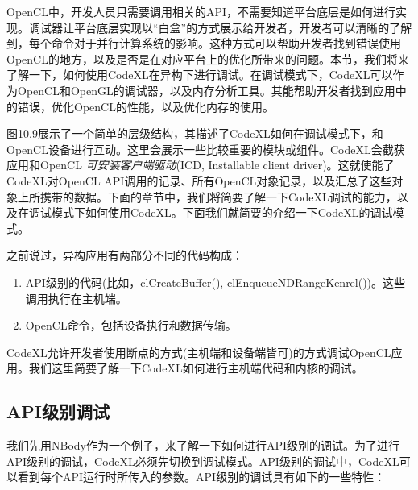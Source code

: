 OpenCL中，开发人员只需要调用相关的API，不需要知道平台底层是如何进行实现。调试器让平台底层实现以“白盒”的方式展示给开发者，开发者可以清晰的了解到，每个命令对于并行计算系统的影响。这种方式可以帮助开发者找到错误使用OpenCL的地方，以及是否是在对应平台上的优化所带来的问题。本节，我们将来了解一下，如何使用CodeXL在异构下进行调试。在调试模式下，CodeXL可以作为OpenCL和OpenGL的调试器，以及内存分析工具。其能帮助开发者找到应用中的错误，优化OpenCL的性能，以及优化内存的使用。


图10.9展示了一个简单的层级结构，其描述了CodeXL如何在调试模式下，和OpenCL设备进行互动。这里会展示一些比较重要的模块或组件。CodeXL会截获应用和OpenCL \emph{可安装客户端驱动}(ICD, Installable client driver)。这就使能了CodeXL对OpenCL API调用的记录、所有OpenCL对象记录，以及汇总了这些对象上所携带的数据。下面的章节中，我们将简要了解一下CodeXL调试的能力，以及在调试模式下如何使用CodeXL。下面我们就简要的介绍一下CodeXL的调试模式。

之前说过，异构应用有两部分不同的代码构成：

\begin{enumerate}
\item API级别的代码(比如，clCreateBuffer(), clEnqueueNDRangeKenrel())。这些调用执行在主机端。
\item OpenCL命令，包括设备执行和数据传输。
\end{enumerate}

CodeXL允许开发者使用断点的方式(主机端和设备端皆可)的方式调试OpenCL应用。我们这里简要了解一下CodeXL如何进行主机端代码和内核的调试。

\subsection{API级别调试}

我们先用NBody作为一个例子，来了解一下如何进行API级别的调试。为了进行API级别的调试，CodeXL必须先切换到调试模式。API级别的调试中，CodeXL可以看到每个API运行时所传入的参数。API级别的调试具有如下的一些特性：

